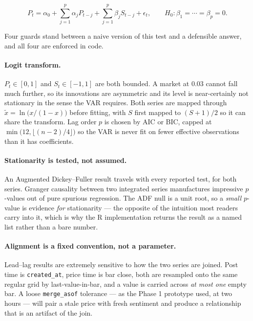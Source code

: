 \documentclass[11pt]{article}
\newcommand{\code}[1]{\texttt{\small #1}}
\begin{document}
\begin{equation}
P_t = \alpha_0 + \sum_{j=1}^{p} \alpha_j P_{t-j} + \sum_{j=1}^{p} \beta_j S_{t-j} + \epsilon_t,
\qquad H_0: \beta_1 = \cdots = \beta_p = 0.
\end{equation}

Four guards stand between a naive version of this test and a defensible answer,
and all four are enforced in code.

\paragraph{Logit transform.} $P_t \in [0,1]$ and $S_t \in [-1,1]$ are both
bounded. A market at $0.03$ cannot fall much further, so its innovations are
asymmetric and its level is near-certainly not stationary in the sense the VAR
requires. Both series are mapped through
$\tilde{x} = \ln\!\big(x/(1-x)\big)$ before fitting, with $S$ first mapped to
$(S+1)/2$ so it can share the transform. Lag order $p$ is chosen by AIC or BIC,
capped at $\min\!\big(12, \lfloor (n-2)/4 \rfloor\big)$ so the VAR is never fit
on fewer effective observations than it has coefficients.

\paragraph{Stationarity is tested, not assumed.} An Augmented Dickey--Fuller
result travels with every reported test, for both series. Granger causality
between two integrated series manufactures impressive $p$-values out of pure
spurious regression. The ADF null is a unit root, so a \emph{small} $p$-value is
evidence \emph{for} stationarity --- the opposite of the intuition most readers
carry into it, which is why the R implementation returns the result as a named
list rather than a bare number.

\paragraph{Alignment is a fixed convention, not a parameter.} Lead--lag results
are extremely sensitive to how the two series are joined. Post time is
\code{created\_at}, price time is bar close, both are resampled onto the same
regular grid by last-value-in-bar, and a value is carried across \emph{at most
one} empty bar. A loose \code{merge\_asof} tolerance --- as the Phase 1
prototype used, at two hours --- will pair a stale price with fresh sentiment
and produce a relationship that is an artifact of the join.
\end{document}
